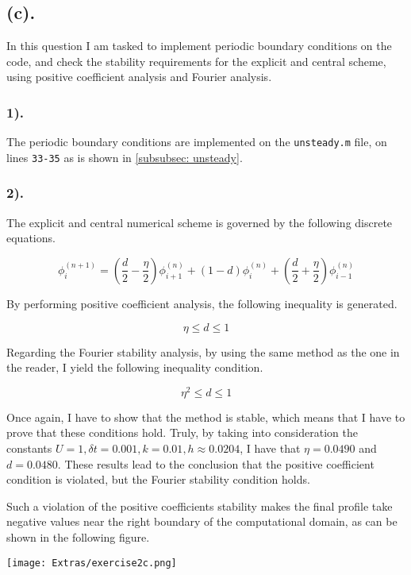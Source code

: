 
\subsection{(c).}
In this question I am tasked to implement periodic boundary conditions on the code, and check the stability requirements for the explicit and central scheme, using positive coefficient analysis and Fourier analysis.

\subsubsection{1).}
The periodic boundary conditions are implemented on the \verb|unsteady.m| file, on lines \verb|33-35| as is shown in \ref{subsubsec: unsteady}. 

\subsubsection{2).}
The explicit and central numerical scheme is governed by the following discrete equations.

\[
	\phi_{i}^{(n+1)} = \left( \frac{d}{2} - \frac{\eta}{2} \right) \phi_{i+1}^{(n)} + (1-d) \phi_{i}^{(n)} + \left(\frac{d}{2} + \frac{\eta}{2} \right) \phi_{i-1}^{(n)}
\]

By performing positive coefficient analysis, the following inequality is generated.

\[
	\eta \leq d \leq 1
\]

Regarding the Fourier stability analysis, by using the same method as the one in the reader, I yield the following inequality condition.

\[
	\eta^2 \leq d \leq 1
\]

Once again, I have to show that the method is stable, which means that I have to prove that these conditions hold. Truly, by taking into consideration the constants \(U = 1, \delta t = 0.001, k = 0.01, h \approx 0.0204\), I have that \( \eta = 0.0490\) and \( d = 0.0480 \). These results lead to the conclusion that the positive coefficient condition is violated, but the Fourier stability condition holds.

Such a violation of the positive coefficients stability makes the final profile take negative values near the right boundary of the computational domain, as can be shown in the following figure.

\texttt{[image: Extras/exercise2c.png]}
